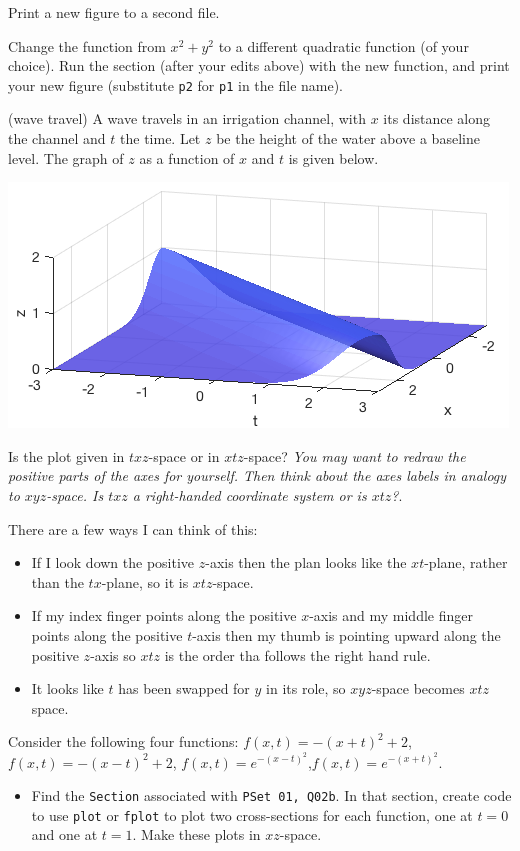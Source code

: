 \documentclass[12pt,letterpaper]{exam}
\begin{document}
\begin{questions}
\begin{parts}
\item Print a new figure to a second file.

Change the function from $x^2+y^2$ to a different quadratic function (of your choice).  Run the section (after your edits above) with the new function, and print your new figure (substitute \texttt{p2} for \texttt{p1} in the file name).


\end{parts}




\item (wave travel) A wave travels in an irrigation channel, with $x$ its distance along the channel and $t$ the time.  Let $z$ be the height of the water above a baseline level.  The graph of $z$ as a function of $x$ and $t$ is given below.  

\includegraphics[width=0.5\linewidth]{img/pset02.png}
\begin{parts}
\item Is the plot given in $txz$-space or in $xtz$-space?  \emph{You may want to redraw the positive parts of the axes for yourself.  Then think about the axes labels in analogy to $xyz$-space.  Is $txz$ a right-handed coordinate system or is $xtz$?}.
\begin{solution}
There are a few ways I can think of this: 
\begin{itemize}
    \item If I look down the positive $z$-axis then the plan looks like the $xt$-plane, rather than the $tx$-plane, so it is $xtz$-space.
    \item If my index finger points along the positive $x$-axis and my middle finger points along the positive $t$-axis then my thumb is pointing upward along the positive $z$-axis so $xtz$ is the order tha follows the right hand rule.
    \item It looks like $t$ has been swapped for $y$ in its role, so $xyz$-space becomes $xtz$ space.
\end{itemize}
\end{solution}
\item  Consider the following four functions: $f(x,t) = -(x+t)^2+2$, $f(x,t) = -(x-t)^2+2$, $f(x,t) = e^{-(x-t)^2}$,$f(x,t) = e^{-(x+t)^2}$.  
\begin{itemize}
    \item Find the \texttt{Section} associated with \texttt{PSet 01, Q02b}.  In that section, create code to use \texttt{plot} or \texttt{fplot} to plot two cross-sections for each function, one at $t = 0$ and one at $t=1$.  Make these plots in $xz$-space.
    

\end{itemize}
\end{parts}
\end{questions}
\end{document}
